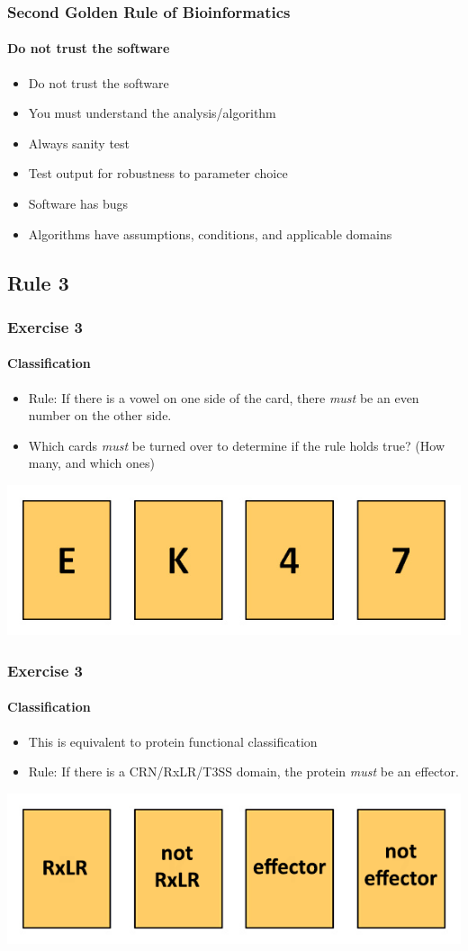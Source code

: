 \documentclass[table]{beamer}
\begin{document}
  \begin{frame}
    \frametitle{Second Golden Rule of Bioinformatics}
    \framesubtitle{Do not trust the software}
	\begin{itemize}
	  \item Do not trust the software
	  \item You must understand the analysis/algorithm
	  \item Always sanity test
	  \item Test output for robustness to parameter choice
	  \item Software has bugs
	  \item Algorithms have assumptions, conditions, and applicable domains
	\end{itemize}
  \end{frame}

  \subsection{Rule 3}  
  \begin{frame}
    \frametitle{Exercise 3}
    \framesubtitle{Classification}
    \begin{itemize}
      \item Rule: If there is a vowel on one side of the card, there \textit{must} be an even number on the other side.
      \item Which cards \textit{must} be turned over to determine if the rule holds true? (How many, and which ones)
    \end{itemize}
    \includegraphics[width=\textwidth]{images/wason}
  \end{frame}

  \begin{frame}
    \frametitle{Exercise 3}
    \framesubtitle{Classification}
    \begin{itemize}
      \item This is equivalent to protein functional classification
      \item Rule: If there is a CRN/RxLR/T3SS domain, the protein \textit{must} be an effector.
    \end{itemize}
    \includegraphics[width=\textwidth]{images/wason_rxlr}
  \end{frame}
\end{document}
